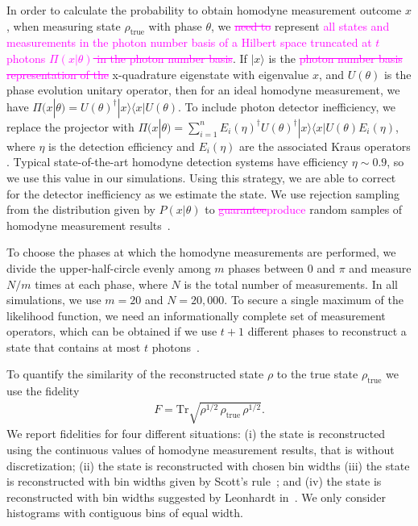 \documentclass[
reprint,
superscriptaddress,
showpacs,
amsmath,
amssymb,
aps,
pra,
longbibliography
]{revtex4-1}
\providecommand{\aucmnt}[1]{#1}
\providecommand{\editcolor}[2]{\textcolor{#1}{#2}}
\providecommand{\aucmnt}[1]{}
\providecommand{\editcolor}[2]{#2}
\newcommand{\SG}[1]{\editcolor{magenta}{#1}}
\newcommand{\SGs}[1]{\aucmnt{\editcolor{magenta}{\sout{#1}}}}
\newcommand{\rhotrue}{\rho_{\text{true}}}
\begin{document}
In order to calculate the probability to obtain homodyne measurement
outcome $x$, when measuring state $\rho_{\mathrm{true}}$ with phase
$\theta$, we \SGs{need to} represent \SG{all states and measurements
  in the photon number basis of a Hilbert space truncated at $t$
  photons} \SGs{$\Pi (x|\theta)$ in the photon number basis}. If
$|x\rangle$ is the \SGs{photon number basis representation of the}
x-quadrature eigenstate with eigenvalue $x$, and $U(\theta)$ is the
phase evolution unitary operator, then for an ideal homodyne
measurement, we have $\Pi(x|\theta) = U(\theta)^{\dagger} |x\rangle
\langle x| U(\theta)$. To include photon detector inefficiency, we
replace the projector with $\Pi(x|\theta) = \sum_{i=1}^{n}
E_i(\eta)^{\dagger} U(\theta)^{\dagger} |x\rangle \langle x| U(\theta)
E_i(\eta)$, where $\eta$ is the detection efficiency and $E_i(\eta)$
are the associated Kraus operators \cite{Lvovsky2004}.  Typical
state-of-the-art homodyne detection systems have efficiency $\eta \sim
0.9$, so we use this value in our simulations. Using this strategy, we
are able to correct for the detector inefficiency as we estimate the
state. We use rejection sampling from the distribution given by
$P(x|\theta)$ to \SGs{guarantee}\SG{produce} random samples of
homodyne measurement results~\cite{Kennedy1980}.

To choose the phases at which the homodyne measurements are performed,
we divide the upper-half-circle evenly among $m$ phases between 0 and
$\pi$ and measure $N/m$ times at each phase, where $N$ is the total
number of measurements. In all simulations, we use $m=20$ and
$N = 20,000$. To secure a single maximum of the likelihood function,
we need an informationally complete set of measurement operators,
which can be obtained if we use $t+1$ different phases to reconstruct
a state that contains at most $t$ photons~\cite{Leonhardt1997}.

To quantify the similarity of the reconstructed state $\rho$ to the
true state $\rhotrue$ we use the fidelity
\begin{eqnarray}
  F = \mathrm{Tr} \sqrt{\rho^{1/2}\, \rhotrue \, \rho^{1/2}}.
\end{eqnarray}
We report fidelities for four different
situations: (i) the state is reconstructed using the continuous values
of homodyne measurement results, that is without discretization; (ii)
the state is reconstructed with chosen bin widths (iii) the state is
reconstructed with bin widths given by Scott's rule~\cite{Scott2010};
and (iv) the state is reconstructed with bin widths suggested by
Leonhardt in~\cite{Leonhardt1997}. We only consider histograms with
contiguous bins of equal width.
\end{document}
